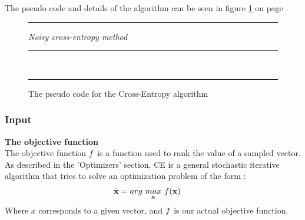 The pseudo code and details of the algorithm can be seen in figure
\ref{fig:ceCode} on page \pageref{fig:ceCode}.

\begin{figure}[H]
\hrule
\vspace{0.2cm}
{\centering  \textit{Noisy cross-entropy method}}
\vspace{0.2cm}
\hrule
\begin{algorithmic}
\\

\Loop
{}
\EndLoop
\end{algorithmic}
\hrule
\caption{The pseudo code for the Cross-Entropy algorithm \label{fig:ceCode}}
\end{figure}

\subsubsection{Input}

\textbf{The objective function \label{CEObjective}} \\
The objective function $f$ is a 
function used to rank the value of a sampled vector.
As described in the 'Optimizers' section, CE is a general stochastic 
iterative algorithm that tries to solve an optimization problem of 
the form \citep{thiery:09}:
\begin{align}
\hat{\textbf{\individual }} &= 
arg \  \underset{\textbf{\individual }}{max} \  
\fitnessFunction (\textbf{\individual }) \ 
\end{align}
Where $x$ corresponds to a given vector, 
and $f$ is our actual objective function. 
\\

